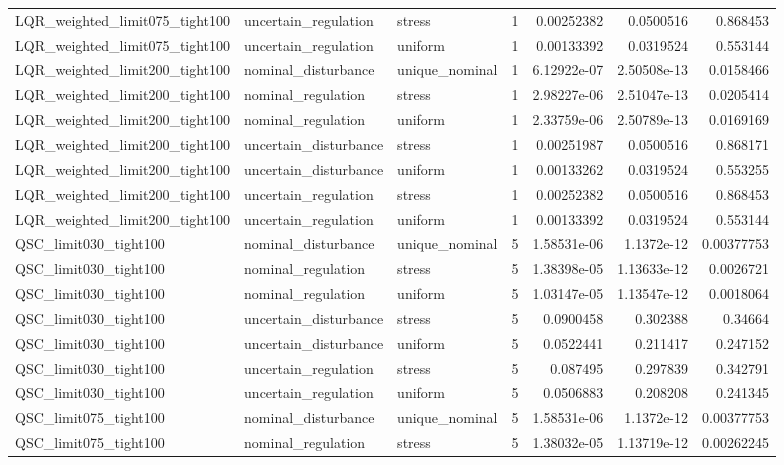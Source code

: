 \begin{tabular}{llllrrr}
LQR\_weighted\_limit075\_tight100 & uncertain\_regulation & stress & 1 & 0.00252382 & 0.0500516 & 0.868453 \\
LQR\_weighted\_limit075\_tight100 & uncertain\_regulation & uniform & 1 & 0.00133392 & 0.0319524 & 0.553144 \\
LQR\_weighted\_limit200\_tight100 & nominal\_disturbance & unique\_nominal & 1 & 6.12922e-07 & 2.50508e-13 & 0.0158466 \\
LQR\_weighted\_limit200\_tight100 & nominal\_regulation & stress & 1 & 2.98227e-06 & 2.51047e-13 & 0.0205414 \\
LQR\_weighted\_limit200\_tight100 & nominal\_regulation & uniform & 1 & 2.33759e-06 & 2.50789e-13 & 0.0169169 \\
LQR\_weighted\_limit200\_tight100 & uncertain\_disturbance & stress & 1 & 0.00251987 & 0.0500516 & 0.868171 \\
LQR\_weighted\_limit200\_tight100 & uncertain\_disturbance & uniform & 1 & 0.00133262 & 0.0319524 & 0.553255 \\
LQR\_weighted\_limit200\_tight100 & uncertain\_regulation & stress & 1 & 0.00252382 & 0.0500516 & 0.868453 \\
LQR\_weighted\_limit200\_tight100 & uncertain\_regulation & uniform & 1 & 0.00133392 & 0.0319524 & 0.553144 \\
QSC\_limit030\_tight100 & nominal\_disturbance & unique\_nominal & 5 & 1.58531e-06 & 1.1372e-12 & 0.00377753 \\
QSC\_limit030\_tight100 & nominal\_regulation & stress & 5 & 1.38398e-05 & 1.13633e-12 & 0.0026721 \\
QSC\_limit030\_tight100 & nominal\_regulation & uniform & 5 & 1.03147e-05 & 1.13547e-12 & 0.0018064 \\
QSC\_limit030\_tight100 & uncertain\_disturbance & stress & 5 & 0.0900458 & 0.302388 & 0.34664 \\
QSC\_limit030\_tight100 & uncertain\_disturbance & uniform & 5 & 0.0522441 & 0.211417 & 0.247152 \\
QSC\_limit030\_tight100 & uncertain\_regulation & stress & 5 & 0.087495 & 0.297839 & 0.342791 \\
QSC\_limit030\_tight100 & uncertain\_regulation & uniform & 5 & 0.0506883 & 0.208208 & 0.241345 \\
QSC\_limit075\_tight100 & nominal\_disturbance & unique\_nominal & 5 & 1.58531e-06 & 1.1372e-12 & 0.00377753 \\
QSC\_limit075\_tight100 & nominal\_regulation & stress & 5 & 1.38032e-05 & 1.13719e-12 & 0.00262245 \\

\end{tabular}
